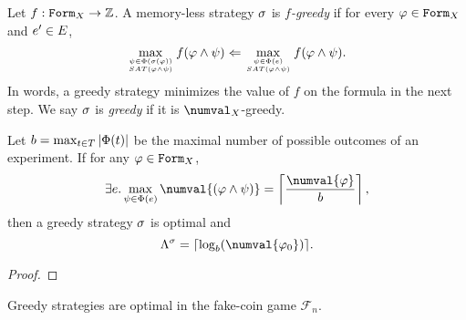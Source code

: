 \begin{definition}
Let $f: \mathtt{Form}_X -> \mathbb{Z}$.
A memory-less strategy $\sigma$ is \emph{$f$-greedy} if
  for every $\varphi\in\mathtt{Form}_X$ and $e'\in E$,
\[
\max_{\psi \in \Phi(\sigma(\varphi)) \atop SAT(\varphi\wedge\psi)} f(\varphi\wedge\psi) <=
\max_{\psi \in \Phi(e) \atop SAT(\varphi\wedge\psi)} f(\varphi\wedge\psi).
\]
In words, a greedy strategy minimizes
  the value of $f$ on the formula in the next step.
We say $\sigma$ is \emph{greedy} if it is $\numval_\Var{}$-greedy.
\end{definition}

\begin{lemma}
Let $b = \max_{t\in T} |\Phi(t)|$ be the maximal number of
  possible outcomes of an experiment.
If for any  $\varphi\in\mathtt{Form}_X$,
\[
  \exists\exp . \max_{\formx\in\outcome(\exp)} \numval{(\form\wedge\formx)} =
  \left\lceil \frac{\numval{\form}}{b} \right\rceil,
\]
then a greedy strategy $\sigma$ is optimal and
\[
  \lenmax{\stg} = \lceil \log_b(\numval{\init}) \rceil.
\]
\end{lemma}

\begin{proof}
\end{proof}

\begin{example}
Greedy strategies are optimal in the fake-coin game $\mathcal{F}_n$.
\end{example}





